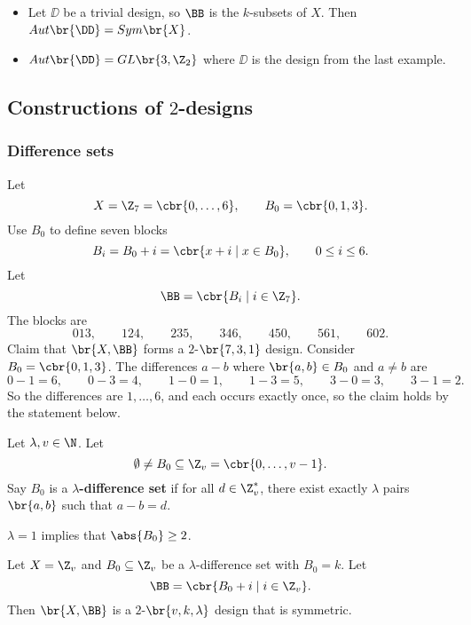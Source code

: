 \begin{example*}
\hfill
\begin{itemize}
\item Let $ \DD $ be a trivial design, so $ \BB $ is the $ k $-subsets of $ X $. Then $ Aut\br{\DD} = Sym\br{X} $.
\item $ Aut\br{\DD} = GL\br{3, \Z_2} $ where $ \DD $ is the design from the last example.
\end{itemize}
\end{example*}

\pagebreak

\subsection{Constructions of \texorpdfstring{$ 2 $}{2}-designs}

\subsubsection{Difference sets}

\begin{example*}
Let
$$ X = \Z_7 = \cbr{0, \dots, 6}, \qquad B_0 = \cbr{0, 1, 3}. $$
Use $ B_0 $ to define seven blocks
$$ B_i = B_0 + i = \cbr{x + i \mid x \in B_0}, \qquad 0 \le i \le 6. $$
Let
$$ \BB = \cbr{B_i \mid i \in \Z_7}. $$
The blocks are
$$ 013, \qquad 124, \qquad 235, \qquad 346, \qquad 450, \qquad 561, \qquad 602. $$
Claim that $ \br{X, \BB} $ forms a $ 2 $-$ \br{7, 3, 1} $ design. Consider $ B_0 = \cbr{0, 1, 3} $. The differences $ a - b $ where $ \br{a, b} \in B_0 $ and $ a \ne b $ are
$$ 0 - 1 = 6, \qquad 0 - 3 = 4, \qquad 1 - 0 = 1, \qquad 1 - 3 = 5, \qquad 3 - 0 = 3, \qquad 3 - 1 = 2. $$
So the differences are $ 1, \dots, 6 $, and each occurs exactly once, so the claim holds by the statement below.
\end{example*}

\begin{definition*}
Let $ \lambda, v \in \N $. Let
$$ \emptyset \ne B_0 \subseteq \Z_v = \cbr{0, \dots, v - 1}. $$
Say $ B_0 $ is a \textbf{$ \lambda $-difference set} if for all $ d \in \Z_v^* $, there exist exactly $ \lambda $ pairs $ \br{a, b} $ such that $ a - b = d $.
\end{definition*}

$ \lambda = 1 $ implies that $ \abs{B_0} \ge 2 $.

\begin{proposition}
Let $ X = \Z_v $ and $ B_0 \subseteq \Z_v $ be a $ \lambda $-difference set with $ B_0 = k $. Let
$$ \BB = \cbr{B_0 + i \mid i \in \Z_v}. $$
Then $ \br{X, \BB} $ is a $ 2 $-$ \br{v, k, \lambda} $ design that is symmetric.
\end{proposition}

